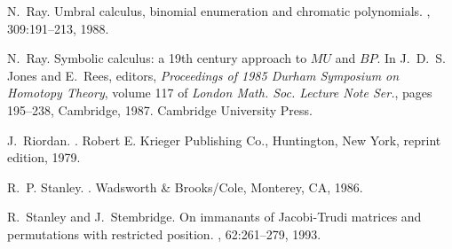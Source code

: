 \documentclass[a4paper,12pt]{amsart}
\theoremstyle{definition}
\numberwithin{equation}{section}
\begin{document}
\begin{thebibliography}{10}
N.~Ray.
\newblock Umbral calculus, binomial enumeration and chromatic polynomials.
, 309:191--213, 1988.

N.~Ray.
\newblock Symbolic calculus: a 19th century approach to \mbox{$MU$} and
  \mbox{$BP$}.
\newblock In J.~D.~S. Jones and E.~Rees, editors, {\em Proceedings of 1985
  Durham Symposium on Homotopy Theory}, volume 117 of {\em London Math. Soc.
  Lecture Note Ser.}, pages 195--238, Cambridge, 1987. Cambridge University
  Press.

J.~Riordan.
.
\newblock Robert E. Krieger Publishing Co., Huntington, New York, reprint
  edition, 1979.

R.~P. Stanley.
.
\newblock Wadsworth \& Brooks/Cole, Monterey, \mbox{CA}, 1986.

R.~Stanley and J.~Stembridge.
\newblock On immanants of \mbox{J}acobi-\mbox{T}rudi matrices and permutations
  with restricted position.
, 62:261--279, 1993.

\end{thebibliography}
\end{document}
